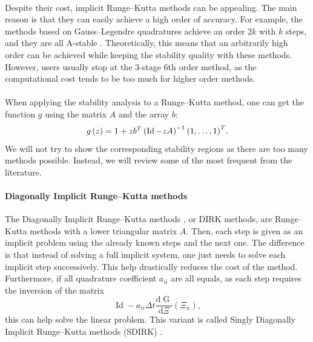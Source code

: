         \paragraph{}
        Despite their cost, implicit Runge--Kutta methods can be appealing.
        The main reason is that they can easily achieve a high order of accuracy.
        For example, the methods based on Gauss--Legendre quadratures achieve an order $2k$ with $k$ steps, and they are all A-stable \cite{Iserles2008}.
        Theoretically, this means that an arbitrarily high order can be achieved while keeping the stability quality with these methods.
        However, users usually stop at the 3-stage 6th order method, as the computational cost tends to be too much for higher order methods.

        \paragraph{}
        When applying the stability analysis to a Runge--Kutta method, one can get the function $g$ using the matrix $A$ and the array $b$:
        \begin{equation}
          g\left(z\right) = 1 + z {b}^T \left(\operatorname{Id} - zA\right)^{-1} {\left(1, \dots, 1\right)}^T .
        \end{equation}
        We will not try to show the corresponding stability regions as there are too many methods possible.
        Instead, we will review some of the most frequent from the literature.

        \paragraph{Diagonally Implicit Runge--Kutta methods}
        The Diagonally Implicit Runge--Kutta methods \cite{Alexander1977}, or DIRK methods, are Runge--Kutta methods with a lower triangular matrix $A$.
        Then, each step is given as an implicit problem using the already known steps and the next one.
        The difference is that instead of solving a full implicit system, one just needs to solve each implicit step successively.
        This help drastically reduces the cost of the method.
        Furthermore, if all quadrature coefficient $a_{ii}$ are all equals, as each step requires the inversion of the matrix
        \begin{equation}
          \operatorname{Id} - a_{ii} \Delta t \frac{\mathrm{d} \operatorname{G}}{\mathrm{d} \Xi}\left(\Xi_n\right) ,
        \end{equation}
        this can help solve the linear problem.
        This variant is called Singly Diagonally Implicit Runge--Kutta methods (SDIRK) \cite{HairerWanner1996}.

